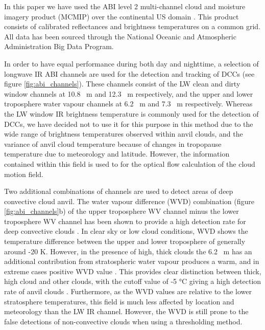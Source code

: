 In this paper we have used the ABI level 2 multi-channel cloud and moisture imagery product (MCMIP) over the continental US domain \citep{schmit_chapter_2020}.
This product consists of calibrated reflectances and brightness temperatures on a common grid.
All data has been sourced through the National Oceanic and Atmospheric Administration Big Data Program.

In order to have equal performance during both day and nighttime, a selection of longwave IR ABI channels are used for the detection and tracking of DCCs (see figure \ref{fig:abi_channels}). 
These channels consist of the LW clean and dirty window channels at 10.8 \unit{\mu m} and 12.3 \unit{\mu m} respectively, and the upper and lower troposphere water vapour channels at 6.2 \unit{\mu m} and 7.3 \unit{\mu m} respectively.
Whereas the LW window IR brightness temperature is commonly used for the detection of DCCs, we have decided not to use it for this purpose in this method due to the wide range of brightness temperatures observed within anvil clouds, and the variance of anvil cloud temperature because of changes in tropopause temperature due to meteorology and latitude.
However, the information contained within this field is used to for the optical flow calculation of the cloud motion field.

Two additional combinations of channels are used to detect areas of deep convective cloud anvil. 
The water vapour difference (WVD) combination (figure \ref{fig:abi_channels}b) of the upper troposphere WV channel minus the lower troposphere WV channel has been shown to provide a high detection rate for deep convective clouds \citep{muller_role_2018, muller_novel_2019}.
In clear sky or low cloud conditions, WVD shows the temperature difference between the upper and lower troposphere of generally around -20 K. 
However, in the presence of high, thick clouds the 6.2 \unit{\mu m} has an additional contribution from stratospheric water vapour produces a warm, and in extreme cases positive WVD value \citep{schmetz_monitoring_1997}.
This provides clear distinction between thick, high cloud and other clouds, with the cutoff value of -5 °C giving a high detection rate of anvil clouds \citep{muller_novel_2019}. 
Furthermore, as the WVD values are relative to the lower stratosphere temperatures, this field is much less affected by location and meteorology than the LW IR channel.
However, the WVD is still prone to the false detections of non-convective clouds when using a thresholding method.

